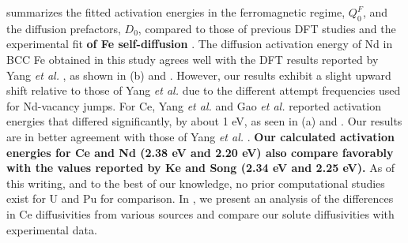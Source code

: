 \documentclass[preprint,12pt]{elsarticle}
\providecommand{\DIFaddtex}[1]{{\bf #1}} %
\providecommand{\DIFdeltex}[1]{} %
\providecommand{\DIFaddbegin}{\protect\color{blue}} %
\providecommand{\DIFaddend}{\protect\color{black}} %
\providecommand{\DIFdelbegin}{\protect\color{red}} %
\providecommand{\DIFdelend}{\protect\color{black}} %
\providecommand{\DIFadd}[1]{\texorpdfstring{\DIFaddtex{#1}}{#1}} %
\providecommand{\DIFdel}[1]{\texorpdfstring{\DIFdeltex{#1}}{}} %
\newcommand{\DIFscaledelfig}{0.5}
\newlength{\DIFdelgraphicswidth} %
\newlength{\DIFdelgraphicsheight} %
\newcommand{\DIFaddincludegraphics}[2][]{{\color{blue}\fbox{\DIFOincludegraphics[#1]{#2}}}} %
\newcommand{\DIFdelincludegraphics}[2][]{%
\sbox{\DIFdelgraphicsbox}{\DIFOincludegraphics[#1]{#2}}%
\settoboxwidth{\DIFdelgraphicswidth}{\DIFdelgraphicsbox} %
\settoboxtotalheight{\DIFdelgraphicsheight}{\DIFdelgraphicsbox} %
\scalebox{\DIFscaledelfig}{%
\parbox[b]{\DIFdelgraphicswidth}{\usebox{\DIFdelgraphicsbox}\\[-\baselineskip] \rule{\DIFdelgraphicswidth}{0em}}\llap{\resizebox{\DIFdelgraphicswidth}{\DIFdelgraphicsheight}{%
\setlength{\unitlength}{\DIFdelgraphicswidth}%
\begin{picture}(1,1)%
\thicklines\linethickness{2pt} %
{\color[rgb]{1,0,0}\put(0,0){\framebox(1,1){}}}%
{\color[rgb]{1,0,0}\put(0,0){\line( 1,1){1}}}%
{\color[rgb]{1,0,0}\put(0,1){\line(1,-1){1}}}%
\end{picture}%
}\hspace*{3pt}}} %
} %
\DeclareRobustCommand{\DIFaddbegin}{\DIFOaddbegin \let\includegraphics\DIFaddincludegraphics} %
\DeclareRobustCommand{\DIFaddend}{\DIFOaddend \let\includegraphics\DIFOincludegraphics} %
\DeclareRobustCommand{\DIFdelbegin}{\DIFOdelbegin \let\includegraphics\DIFdelincludegraphics} %
\DeclareRobustCommand{\DIFdelend}{\DIFOaddend \let\includegraphics\DIFOincludegraphics} %
\begin{document}
 summarizes the fitted activation energies in the ferromagnetic regime, $Q_0^F$, and the diffusion prefactors, $D_0$, compared to those of previous DFT studies \DIFdelbegin \DIFdel{\cite{yang_significant_2023,sandberg2015modeling, GAO2016316} }\DIFdelend \DIFaddbegin \DIFadd{\cite{yang_significant_2023, ke2025diffusion,sandberg2015modeling, GAO2016316} }\DIFaddend and the experimental fit \DIFaddbegin \DIFadd{of Fe self-diffusion }\DIFaddend \cite{lubbehusen1990self}. 
The diffusion activation energy of Nd in BCC Fe obtained in this study agrees well with the DFT results reported by Yang \textit{et al.} \cite{yang_significant_2023}, as shown in (b) and . However, our results exhibit a slight upward shift relative to those of Yang \textit{et al.} due to the different attempt frequencies used for Nd-vacancy jumps. For Ce, Yang \textit{et al.} \cite{yang_significant_2023} and Gao \textit{et al.} \cite{GAO2016316} reported activation energies that differed significantly, by about 1 eV, as seen in (a) and . Our results are in better agreement with those of Yang \textit{et al.} \cite{yang_significant_2023}. \DIFaddbegin \DIFadd{Our calculated activation energies for Ce and Nd (2.38 eV and 2.20 eV) also compare favorably with the values reported by Ke and Song \cite{ke2025diffusion} (2.34 eV and 2.25 eV).
}\DIFaddend As of this writing, and to the best of our knowledge, no prior computational studies exist for U and Pu for comparison. 
In , we present an analysis of the differences in Ce diffusivities from various sources and compare our solute diffusivities with experimental data.
\end{document}
